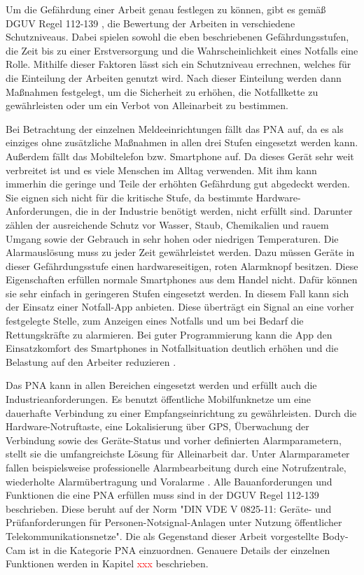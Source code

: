 \documentclass[thesis.tex]{subfiles}
\begin{document}
Um die Gefährdung einer Arbeit genau festlegen zu können, gibt es gemäß DGUV Regel 112-139 \cite[]{Regel_112-139}, die Bewertung der Arbeiten in verschiedene Schutzniveaus.
Dabei spielen sowohl die eben beschriebenen Gefährdungsstufen, die Zeit bis zu einer Erstversorgung und die Wahrscheinlichkeit eines Notfalls eine Rolle.
Mithilfe dieser Faktoren lässt sich ein Schutzniveau errechnen, welches für die Einteilung der Arbeiten genutzt wird.
Nach dieser Einteilung werden dann Maßnahmen festgelegt, um die Sicherheit zu erhöhen, die Notfallkette zu gewährleisten oder um ein Verbot von Alleinarbeit zu bestimmen.

Bei Betrachtung der einzelnen Meldeeinrichtungen fällt das PNA auf, da es als einziges ohne zusätzliche Maßnahmen in allen drei Stufen eingesetzt werden kann.
Außerdem fällt das Mobiltelefon bzw. Smartphone auf.
Da dieses Gerät sehr weit verbreitet ist und es viele Menschen im Alltag verwenden.
Mit ihm kann immerhin die geringe und Teile der erhöhten Gefährdung gut abgedeckt werden.
Sie eignen sich nicht für die kritische Stufe, da bestimmte Hardware-Anforderungen, die in der Industrie benötigt werden, nicht erfüllt sind.
Darunter zählen der ausreichende Schutz vor Wasser, Staub, Chemikalien und rauem Umgang sowie der Gebrauch in sehr hohen oder niedrigen Temperaturen.
Die Alarmauslösung muss zu jeder Zeit gewährleistet werden.
Dazu müssen Geräte in dieser Gefährdungsstufe einen hardwareseitigen, roten Alarmknopf besitzen.
Diese Eigenschaften erfüllen normale Smartphones aus dem Handel nicht.
Dafür können sie sehr einfach in geringeren Stufen eingesetzt werden.
In diesem Fall kann sich der Einsatz einer Notfall-App anbieten.
Diese überträgt ein Signal an eine vorher festgelegte Stelle, zum Anzeigen eines Notfalls und um bei Bedarf die Rettungskräfte zu alarmieren.
Bei guter Programmierung kann die App den Einsatzkomfort des Smartphones in Notfallsituation deutlich erhöhen und die Belastung auf den Arbeiter reduzieren \cite[vgl. S.2-5]{FAQ-PNAuAPP}.

Das PNA kann in allen Bereichen eingesetzt werden und erfüllt auch die Industrieanforderungen.
Es benutzt öffentliche Mobilfunknetze um eine dauerhafte Verbindung zu einer Empfangseinrichtung zu gewährleisten.
Durch die Hardware-Notruftaste, eine Lokalisierung über GPS, Überwachung der Verbindung sowie des Geräte-Status und vorher definierten Alarmparametern, stellt sie die umfangreichste Lösung für Alleinarbeit dar.
Unter Alarmparameter fallen beispielsweise professionelle Alarmbearbeitung durch eine Notrufzentrale, wiederholte Alarmübertragung und Voralarme \cite[vgl. S.2-5]{FAQ-PNAuAPP}.
Alle Bauanforderungen und Funktionen die eine PNA erfüllen muss sind in der DGUV Regel 112-139 \cite[]{Regel_112-139} beschrieben.
Diese beruht auf der Norm "DIN VDE V 0825-11: Geräte- und Prüfanforderungen für Personen-Notsignal-Anlagen unter Nutzung öffentlicher Telekommunikationsnetze".
Die als Gegenstand dieser Arbeit vorgestellte Body-Cam ist in die Kategorie PNA einzuordnen.
Genauere Details der einzelnen Funktionen werden in Kapitel \textcolor{red}{xxx} beschrieben.
\\
\end{document}
